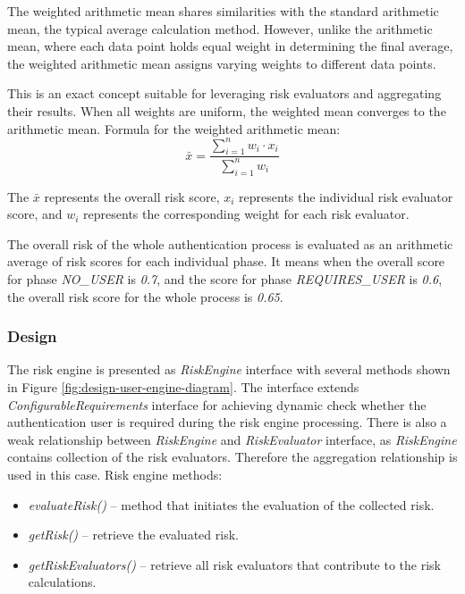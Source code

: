 The weighted arithmetic mean shares similarities with the standard arithmetic mean, the typical average calculation method.
However, unlike the arithmetic mean, where each data point holds equal weight in determining the final average, the weighted arithmetic mean assigns varying weights to different data points.

This is an exact concept suitable for leveraging risk evaluators and aggregating their results.
When all weights are uniform, the weighted mean converges to the arithmetic mean.
\newline
\newline
Formula for the weighted arithmetic mean:
\begin{equation}
\bar{x} = \frac{\sum_{i=1}^{n} w_i \cdot x_i}{\sum_{i=1}^{n} w_i}
\end{equation}

The \( \bar{x} \) represents the overall risk score, \( x_i \) represents the individual risk evaluator score, and \( w_i \) represents the corresponding weight for each risk evaluator.

The overall risk of the whole authentication process is evaluated as an arithmetic average of risk scores for each individual phase.
It means when the overall score for phase \textit{NO\_USER} is \textit{0.7}, and the score for phase \textit{REQUIRES\_USER} is \textit{0.6}, the overall risk score for the whole process is \textit{0.65}. 

\subsubsection{Design}
The risk engine is presented as \textit{RiskEngine} interface with several methods shown in Figure \ref{fig:design-user-engine-diagram}.
The interface extends \textit{ConfigurableRequirements} interface for achieving dynamic check whether the authentication user is required during the risk engine processing.
There is also a weak relationship between \textit{RiskEngine} and \textit{RiskEvaluator} interface, as \textit{RiskEngine} contains collection of the risk evaluators.
Therefore the aggregation relationship is used in this case. 
\newline
\newline
Risk engine methods:

\begin{itemize}
    \item \textit{evaluateRisk()} -- method that initiates the evaluation of the collected risk.
    \item \textit{getRisk()} -- retrieve the evaluated risk.
    \item \textit{getRiskEvaluators()} -- retrieve all risk evaluators that contribute to the risk calculations.
\end{itemize}

